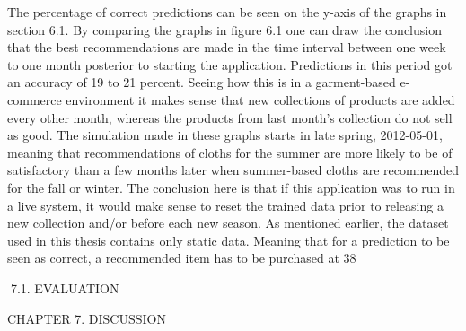 The percentage of correct predictions can be seen on the y-axis of the graphs in section
6.1. By comparing the graphs in figure 6.1 one can draw the conclusion that the best
recommendations are made in the time interval between one week to one month posterior to starting the application. Predictions in this period got an accuracy of 19 to 21
percent. Seeing how this is in a garment-based e-commerce environment it makes sense
that new collections of products are added every other month, whereas the products from
last month’s collection do not sell as good. The simulation made in these graphs starts
in late spring, 2012-05-01, meaning that recommendations of cloths for the summer are
more likely to be of satisfactory than a few months later when summer-based cloths are
recommended for the fall or winter. The conclusion here is that if this application was
to run in a live system, it would make sense to reset the trained data prior to releasing
a new collection and/or before each new season.
As mentioned earlier, the dataset used in this thesis contains only static data. Meaning
that for a prediction to be seen as correct, a recommended item has to be purchased at
38

7.1. EVALUATION

CHAPTER 7. DISCUSSION

